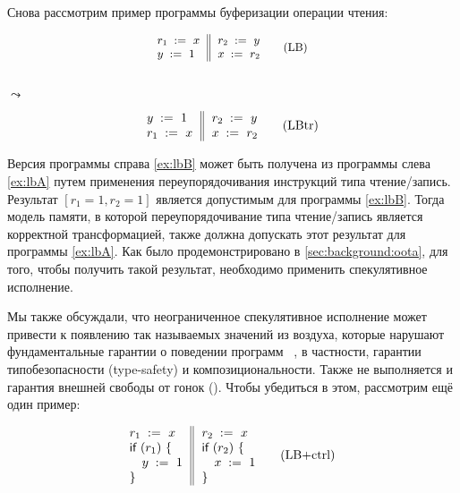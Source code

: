Снова рассмотрим  пример программы буферизации операции чтения:

\begin{minipage}{0.43\linewidth}
\begin{equation*}
\small
\inarrII{
  \readInst{}{r_1}{x}     \\
  \writeInst{}{y}{1}      \\
}{
  \readInst{}{r_2}{y}     \\
  \writeInst{}{x}{r_2}    \\
}
\tag{LB}\label{ex:lbA}
\end{equation*}
\end{minipage}\hfill%
\begin{minipage}{0.09\linewidth}
\Large~\\ $\leadsto$
\end{minipage}\hfill%
\begin{minipage}{0.43\linewidth}
\begin{equation*}
\inarrII{
  \writeInst{}{y}{1}      \\
  \readInst{}{r_1}{x}     \\
}{
  \readInst{}{r_2}{y}     \\
  \writeInst{}{x}{r_2}    \\
}
\tag{LBtr}\label{ex:lbB}
\end{equation*}
\end{minipage}

Версия программы справа \ref{ex:lbB} может быть 
получена из программы слева \ref{ex:lbA} 
путем применения переупорядочивания инструкций типа чтение/запись. 
Результат ${[r_1=1, r_2=1]}$ является допустимым для программы \ref{ex:lbB}.
Тогда модель памяти, в которой переупорядочивание типа чтение/запись
является корректной трансформацией, также должна 
допускать этот результат для программы \ref{ex:lbA}.
Как было продемонстрировано в \cref{sec:background:oota}, 
для того, чтобы получить такой результат, 
необходимо применить спекулятивное исполнение. 

Мы также обсуждали, что неограниченное 
спекулятивное исполнение может привести к появлению 
так называемых значений из воздуха, 
которые нарушают фундаментальные гарантии 
о поведении программ~%
\cite{Boehm-Demsky:MSPC14, Batty-al:ESOP15}, 
в частности, гарантии типобезопасности (type-safety)
и композициональности.  
Также не выполняется и гарантия внешней свободы от гонок (\eDRF).
Чтобы убедиться в этом, рассмотрим ещё один пример:

\begin{equation*}
\inarrII{
  \readInst{}{r_1}{x}      \\
  \kw{if} {(r_1)} ~\{      \\
  \quad\writeInst{}{y}{1}  \\
  \}
}{
  \readInst{}{r_2}{x}      \\
  \kw{if} {(r_2)} ~\{      \\
  \quad\writeInst{}{x}{1}  \\
  \}
}
\tag{LB+ctrl}\label{ex:lb+ctrl}
\end{equation*}

